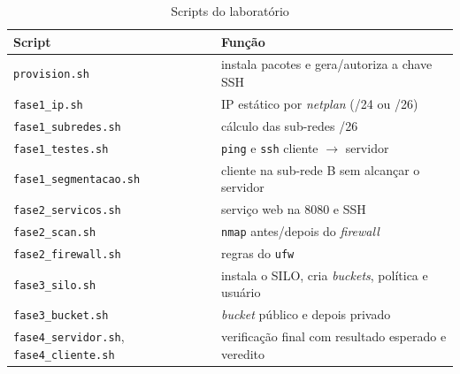 \begin{table}[htbp]
  \centering
  \caption{Scripts do laboratório}\label{tab:scripts}
  \footnotesize
  \begin{tabular}{L{0.32\textwidth}L{0.6\textwidth}}
    \hline
    \textbf{Script} & \textbf{Função} \\
    \hline
    \texttt{provision.sh} & instala pacotes e gera/autoriza a chave SSH \\
    \texttt{fase1\_ip.sh} & IP estático por \textit{netplan} (/24 ou /26) \\
    \texttt{fase1\_subredes.sh} & cálculo das sub-redes /26 \\
    \texttt{fase1\_testes.sh} & \texttt{ping} e \texttt{ssh} cliente $\rightarrow$ servidor \\
    \texttt{fase1\_segmentacao.sh} & cliente na sub-rede B sem alcançar o servidor \\
    \texttt{fase2\_servicos.sh} & serviço web na 8080 e SSH \\
    \texttt{fase2\_scan.sh} & \texttt{nmap} antes/depois do \textit{firewall} \\
    \texttt{fase2\_firewall.sh} & regras do \texttt{ufw} \\
    \texttt{fase3\_silo.sh} & instala o SILO, cria \textit{buckets}, política e usuário \\
    \texttt{fase3\_bucket.sh} & \textit{bucket} público e depois privado \\
    \texttt{fase4\_servidor.sh}, \texttt{fase4\_cliente.sh} & verificação final com resultado esperado e veredito \\
    \hline
  \end{tabular}
\end{table}
\fi

\ifcompleto
{}
\fi
